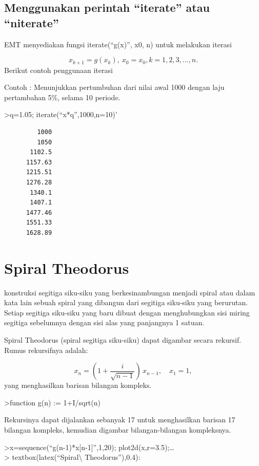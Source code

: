 \documentclass[
]{book}
\begin{document}
\section{Menggunakan perintah ``iterate'' atau ``niterate''}\label{menggunakan-perintah-iterate-atau-niterate}

EMT menyediakan fungsi iterate(``g(x)'', x0, n) untuk melakukan iterasi

\[x_{k+1}=g(x_k), \ x_0=x_0, k= 1, 2, 3, ..., n.\]Berikut contoh penggunaan iterasi

Contoh : Menunjukkan pertumbuhan dari nilai awal 1000 dengan laju pertambahan 5\%, selama 10 periode.

\textgreater q=1.05; iterate(``x*q'',1000,n=10)'

\begin{verbatim}
         1000 
         1050 
       1102.5 
      1157.63 
      1215.51 
      1276.28 
       1340.1 
       1407.1 
      1477.46 
      1551.33 
      1628.89 
\end{verbatim}

\chapter{Spiral Theodorus}\label{spiral-theodorus}

konstruksi segitiga siku-siku yang berkesinambungan menjadi spiral atau dalam kata lain sebuah spiral yang dibangun dari segitiga siku-siku yang berurutan. Setiap segitiga siku-siku yang baru dibuat dengan menghubungkan sisi miring segitiga sebelumnya dengan sisi alas yang panjangnya 1 satuan.

Spiral Theodorus (spiral segitiga siku-siku) dapat digambar secara rekursif. Rumus rekursifnya adalah:

\[x_n = \left( 1 + \frac{i}{\sqrt{n-1}} \right) \, x_{n-1}, \quad x_1=1,\]yang menghasilkan barisan bilangan kompleks.

\textgreater function g(n) := 1+I/sqrt(n)

Rekursinya dapat dijalankan sebanyak 17 untuk menghasilkan barisan 17 bilangan kompleks, kemudian digambar bilangan-bilangan kompleksnya.

\textgreater x=sequence(``g(n-1)*x{[}n-1{]}'',1,20); plot2d(x,r=3.5);\ldots{}\\
\textgreater{} textbox(latex(``Spiral\textbackslash{} Theodorus''),0.4):
\end{document}

